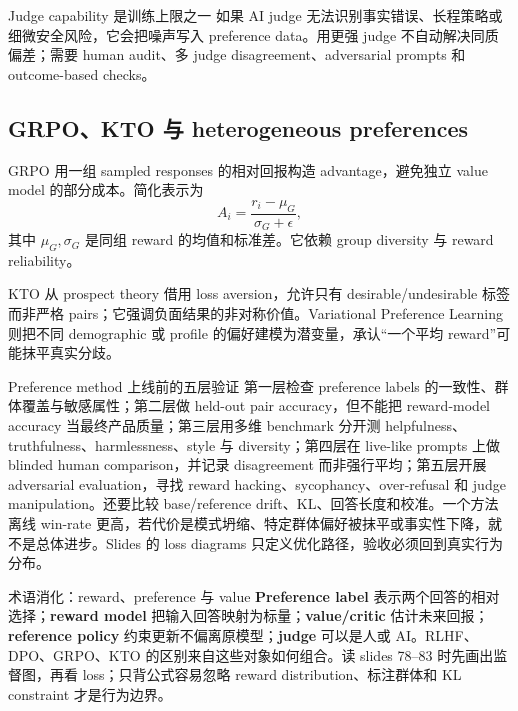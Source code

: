 \begin{warningbox}{Judge capability 是训练上限之一}
如果 AI judge 无法识别事实错误、长程策略或细微安全风险，它会把噪声写入 preference data。用更强 judge 不自动解决同质偏差；需要 human audit、多 judge disagreement、adversarial prompts 和 outcome-based checks。
\end{warningbox}

\subsection{GRPO、KTO 与 heterogeneous preferences}

GRPO 用一组 sampled responses 的相对回报构造 advantage，避免独立 value model 的部分成本。简化表示为
\[
A_i=\frac{r_i-\mu_G}{\sigma_G+\epsilon},
\]
其中 $\mu_G,\sigma_G$ 是同组 reward 的均值和标准差。它依赖 group diversity 与 reward reliability。



KTO 从 prospect theory 借用 loss aversion，允许只有 desirable/undesirable 标签而非严格 pairs；它强调负面结果的非对称价值。Variational Preference Learning 则把不同 demographic 或 profile 的偏好建模为潜变量，承认“一个平均 reward”可能抹平真实分歧。





\begin{warningbox}{Preference method 上线前的五层验证}
第一层检查 preference labels 的一致性、群体覆盖与敏感属性；第二层做 held-out pair accuracy，但不能把 reward-model accuracy 当最终产品质量；第三层用多维 benchmark 分开测 helpfulness、truthfulness、harmlessness、style 与 diversity；第四层在 live-like prompts 上做 blinded human comparison，并记录 disagreement 而非强行平均；第五层开展 adversarial evaluation，寻找 reward hacking、sycophancy、over-refusal 和 judge manipulation。还要比较 base/reference drift、KL、回答长度和校准。一个方法离线 win-rate 更高，若代价是模式坍缩、特定群体偏好被抹平或事实性下降，就不是总体进步。Slides 的 loss diagrams 只定义优化路径，验收必须回到真实行为分布。
\end{warningbox}

\begin{knowledgebox}{术语消化：reward、preference 与 value}
\textbf{Preference label} 表示两个回答的相对选择；\textbf{reward model} 把输入回答映射为标量；\textbf{value/critic} 估计未来回报；\textbf{reference policy} 约束更新不偏离原模型；\textbf{judge} 可以是人或 AI。RLHF、DPO、GRPO、KTO 的区别来自这些对象如何组合。读 slides 78--83 时先画出监督图，再看 loss；只背公式容易忽略 reward distribution、标注群体和 KL constraint 才是行为边界。
\end{knowledgebox}

